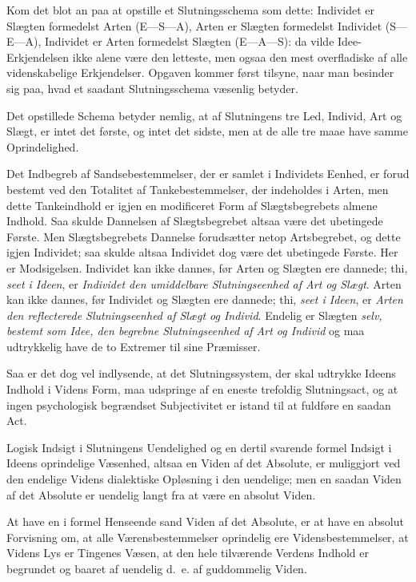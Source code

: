 \documentclass[12pt]{book}
\newcommand{\opage}[1]{\marginnote{\footnotesize\textit{[#1]}}}
\begin{document}
Kom det blot an paa at opstille et Slutningsschema som dette:
Individet er Slægten formedelst Arten (E---S---A), Arten er Slægten
formedelst Individet (S---E---A), Individet er Arten formedelst
Slægten (E---A---S): da vilde Idee-Erkjendelsen ikke alene være den
letteste, men ogsaa den mest overfladiske af alle videnskabelige
Erkjendelser. Opgaven kommer først tilsyne, naar man besinder sig
paa, hvad et saadant Slutningsschema væsenlig betyder.

Det opstillede Schema betyder nemlig, at af Slutningens tre Led,
Individ, Art og Slægt, er intet det første, og intet det sidste, men
at de alle tre maae have samme Oprindelighed.

Det Indbegreb af Sandsebestemmelser, der er samlet i Individets
Eenhed, er forud bestemt ved den Totalitet af Tankebestemmelser, der
indeholdes i Arten, men dette Tankeindhold er igjen en modificeret
Form af Slægtsbegrebets almene Indhold. Saa skulde Dannelsen af
Slægtsbegrebet altsaa være det ubetingede Første. Men Slægtsbegrebets
Dannelse forudsætter netop Artsbegrebet, og dette igjen Individet;
saa skulde altsaa Individet dog være det ubetingede Første. Her er
Modsigelsen. Individet kan ikke dannes, før Arten og Slægten ere
dannede; thi, \emph{seet i Ideen}, er \emph{Individet den
umiddelbare Slutningseenhed af Art og Slægt}. Arten kan ikke dannes,
før Individet og Slægten ere dannede; thi, \emph{seet i Ideen}, er
\emph{Arten den
\opage{22} reflecterede Slutningseenhed af Slægt og Individ}. Endelig er Slægten
\emph{selv, bestemt som Idee, den begrebne Slutningseenhed af Art og
Individ} og maa udtrykkelig have de to Extremer til sine Præmisser.

Saa er det dog vel indlysende, at det Slutningssystem, der skal
udtrykke Ideens Indhold i Videns Form, maa udspringe af en eneste
trefoldig Slutningsact, og at ingen psychologisk begrændset
Subjectivitet er istand til at fuldføre en saadan Act.

Logisk Indsigt i Slutningens Uendelighed og en dertil svarende formel
Indsigt i Ideens oprindelige Væsenhed, altsaa en Viden af det
Absolute, er muliggjort ved den endelige Videns dialektiske Opløsning
i den uendelige; men en saadan Viden af det Absolute er uendelig
langt fra at være en absolut Viden.

At have en i formel Henseende sand Viden af det Absolute, er at have
en absolut Forvisning om, at alle Værensbestemmelser oprindelig ere
Vidensbestemmelser, at Videns Lys er Tingenes Væsen, at den hele
tilværende Verdens Indhold er begrundet og baaret af uendelig
d.~e. af guddommelig Viden.
\end{document}
